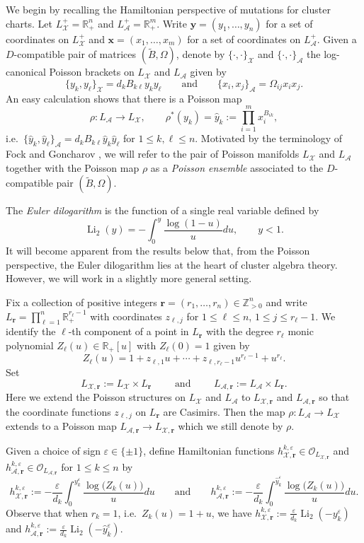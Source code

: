 \documentclass{amsart}
\numberwithin{equation}{section}
\newcommand{\bfr}{{\boldsymbol{r}}}
\newcommand{\bfx}{{\boldsymbol{x}}}
\newcommand{\bfy}{{\boldsymbol{y}}}
\newcommand{\cA}{\mathcal{A}}
\newcommand{\cO}{\mathcal{O}}
\newcommand{\cX}{\mathcal{X}}
\newcommand{\RR}{\mathbb{R}}
\newcommand{\ZZ}{\mathbb{Z}}
\newcommand{\Li}{\operatorname{Li}}
\begin{document}
We begin by recalling the Hamiltonian perspective of mutations for cluster charts.
Let $L^+_\cX=\RR_+^n$ and $L^+_\cA=\RR_+^m$.
Write $\bfy=(y_1,\ldots,y_n)$ for a set of coordinates on $L^+_\cX$ and $\bfx=(x_1,\ldots,x_m)$ for a set of coordinates on $L^+_\cA$.
Given a $D$-compatible pair of matrices $(\tilde B,\Omega)$, denote by $\{\cdot,\cdot\}_\cX$ and $\{\cdot,\cdot\}_\cA$ the log-canonical Poisson brackets on $L_\cX$ and $L_\cA$ given by
\begin{equation}
  \label{eq:brackets}
  \{y_k,y_\ell\}_\cX=d_kB_{k\ell}y_ky_\ell\qquad\text{and}\qquad\{x_i,x_j\}_\cA=\Omega_{ij}x_ix_j.
\end{equation}
An easy calculation shows that there is a Poisson map
\[\rho:L_\cA\to L_\cX,\qquad \rho^*(y_k)=\hat y_k:=\prod_{i=1}^m x_i^{B_{ik}},\]
i.e.\ $\{\hat y_k,\hat y_\ell\}_\cA=d_kB_{k\ell}\hat y_k\hat y_\ell$ for $1\le k,\ell\le n$.
Motivated by the terminology of Fock and Goncharov \cite{FG09a}, we will refer to the pair of Poisson manifolds $L_\cX$ and $L_\cA$ together with the Poisson map $\rho$ as a \emph{Poisson ensemble} associated to the $D$-compatible pair $(\tilde B,\Omega)$.

The \emph{Euler dilogarithm} is the function of a single real variable defined by
\[\Li_2(y)=-\int_0^y \frac{\log(1-u)}{u}du,\qquad y<1.\]
It will become apparent from the results below that, from the Poisson perspective, the Euler dilogarithm lies at the heart of cluster algebra theory.
However, we will work in a slightly more general setting.

Fix a collection of positive integers $\bfr=(r_1,\ldots,r_n)\in\ZZ_{>0}^n$ and write $L_\bfr=\prod_{\ell=1}^n \RR_+^{r_\ell-1}$ with coordinates $z_{\ell,j}$ for $1\le\ell\le n$, $1\le j\le r_\ell-1$.
We identify the $\ell$-th component of a point in $L_\bfr$ with the degree $r_\ell$ monic polynomial $Z_\ell(u)\in\RR_+[u]$ with $Z_\ell(0)=1$ given by
\[Z_\ell(u)=1+z_{\ell,1}u+\cdots+z_{\ell,r_\ell-1}u^{r_\ell-1}+u^{r_\ell}.\]
Set 
\[L_{\cX,\bfr}:=L_\cX\times L_\bfr\qquad\text{ and }\qquad L_{\cA,\bfr}:=L_\cA\times L_\bfr.\]
Here we extend the Poisson structures on $L_\cX$ and $L_\cA$ to $L_{\cX,\bfr}$ and $L_{\cA,\bfr}$ so that the coordinate functions $z_{\ell,j}$ on $L_\bfr$ are Casimirs. 
Then the map $\rho:L_\cA\to L_\cX$ extends to a Poisson map $L_{\cA,\bfr}\to L_{\cX,\bfr}$ which we still denote by $\rho$.

Given a choice of sign $\varepsilon\in\{\pm1\}$, define Hamiltonian functions $h^{k,\varepsilon}_{\cX,\bfr}\in\cO_{L_{\cX,\bfr}}$ and $h^{k,\varepsilon}_{\cA,\bfr}\in\cO_{L_{\cA,\bfr}}$ for $1\le k\le n$ by
\begin{equation}
  \label{eq:hamiltonians}
  h_{\cX,\bfr}^{k,\varepsilon}:=-\frac{\varepsilon}{d_k}\int_0^{y_k^\varepsilon} \frac{\log\big(Z_k(u)\big)}{u}du\qquad\text{and}\qquad h_{\cA,\bfr}^{k,\varepsilon}:=-\frac{\varepsilon}{d_k}\int_0^{\hat y_k^\varepsilon} \frac{\log\big(Z_k(u)\big)}{u}du.
\end{equation}
Observe that when $r_k=1$, i.e.\ $Z_k(u)=1+u$, we have $h_{\cX,\bfr}^{k,\varepsilon}:=\frac{\varepsilon}{d_k}\Li_2(-y_k^\varepsilon)$ and $h_{\cA,\bfr}^{k,\varepsilon}:=\frac{\varepsilon}{d_k}\Li_2(-\hat y_k^\varepsilon)$.
\end{document}
